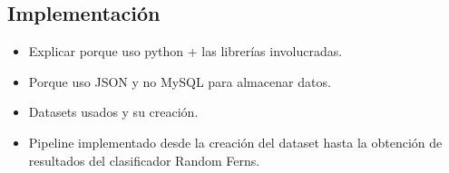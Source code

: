 \subsection{Implementación}

	\begin{itemize}
		\item Explicar porque uso python + las librerías involucradas.
		\item Porque uso JSON y no MySQL para almacenar datos.
		\item Datasets usados y su creación.
		\item Pipeline implementado desde la creación del dataset hasta la obtención de resultados del clasificador Random Ferns.
	\end{itemize}